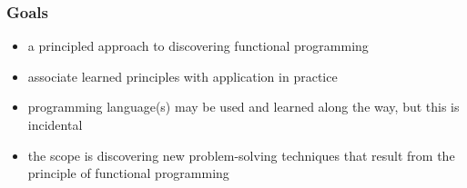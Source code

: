 \begin{frame}
\frametitle{Goals}

\begin{itemize}
  \item<1> a principled approach to discovering functional programming
  \item<2> associate learned principles with application in practice
  \item<3> programming language(s) may be used and learned along the way, but this is incidental
  \item<4> the scope is discovering new problem-solving techniques that result from the principle of functional programming
\end{itemize}
\end{frame}
